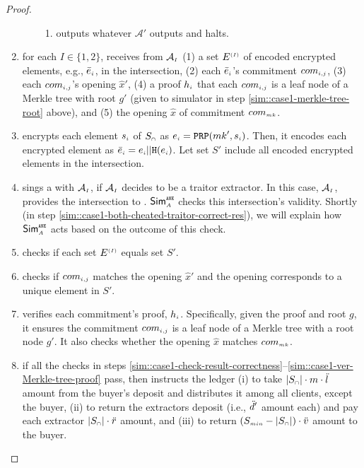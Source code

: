 \begin{proof}
\begin{enumerate}
\begin{enumerate}
\begin{enumerate}
%
\item outputs whatever $\mathcal{A}'$ outputs and halts.
 \end{enumerate}
 \end{enumerate}
%
\item\label{sim::case1-what-adv-extract-sends}  for each $I\in \{1,2\}$, receives from $\mathcal{A}_{\scriptscriptstyle I}$ (1) a set $E^{\scriptscriptstyle (I)}$ of encoded encrypted elements, e.g., $\bar e_{\scriptscriptstyle i}$, in the intersection, (2) each $\bar e_{\scriptscriptstyle i}$'s commitment $com_{\scriptscriptstyle i,j}$, (3) each $com_{\scriptscriptstyle i,j}$'s opening $\hat{x}'$, (4) a proof $h_{\scriptscriptstyle i}$ that each $com_{\scriptscriptstyle i,j}$ is a leaf node of a Merkle tree with root $g'$ (given to simulator in step \ref{sim::case1-merkle-tree-root} above), and (5) the opening $\hat x$ of commitment  $com_{\scriptscriptstyle {mk}}$.
%
\item encrypts each element $s_{\scriptscriptstyle i}$ of $S_{\scriptscriptstyle\cap}$ as $e_{\scriptscriptstyle i}=\mathtt{PRP}({mk}', s_{\scriptscriptstyle i})$. Then, it encodes each encrypted element as $\bar{e}_{\scriptscriptstyle i} =e_{\scriptscriptstyle i} || \mathtt{H}(e_{\scriptscriptstyle i})$. Let set $S'$ include all encoded encrypted elements in the intersection.
%
\item\label{sim::case1-traitor-cont} sings a \SCtc with $\mathcal{A}_{\scriptscriptstyle I}$, if $\mathcal{A}_{\scriptscriptstyle I}$ decides to be a traitor extractor. In this case, $\mathcal{A}_{\scriptscriptstyle I}$, provides the intersection to \SCtc.  $\mathsf{Sim}^{\scriptscriptstyle \mathtt{ANE}}_{\scriptscriptstyle A}$ checks this intersection's validity. Shortly (in step \ref{sim::case1-both-cheated-traitor-correct-res}), we will explain how $\mathsf{Sim}^{\scriptscriptstyle \mathtt{ANE}}_{\scriptscriptstyle A}$ acts based on the outcome of this check. 
%
\item\label{sim::case1-check-result-correctness} checks if each set $E^{\scriptscriptstyle (I)}$ equals set $S'$. 
%
\item checks if $com_{\scriptscriptstyle i,j}$ matches the opening $\hat{x}'$ and the opening corresponds to a unique element in $S'$. 
%
\item\label{sim::case1-ver-Merkle-tree-proof} verifies each commitment's proof, $h_{\scriptscriptstyle i}$. Specifically, given the proof and root $g$, it ensures the commitment $com_{\scriptscriptstyle i,j}$  is a leaf node of a Merkle tree with a root node $g'$. It also checks whether the opening $\hat x$ matches $com_{\scriptscriptstyle {mk}}$. 
%
%
\item \label{sim::case1-all-check-pass} if all the checks in steps \ref{sim::case1-check-result-correctness}--\ref{sim::case1-ver-Merkle-tree-proof} pass, then instructs the ledger (i) to take $|S_{\scriptscriptstyle\cap}|\cdot m\cdot \ddot{l}$ amount from the buyer's deposit and distributes it among all clients, except the buyer, (ii) to return the extractors deposit (i.e., $\ddot{d}'$ amount each) and pay each extractor $|S_{\scriptscriptstyle\cap}|\cdot \ddot{r}$ amount, and (iii) to return $(S_{\scriptscriptstyle min}-|S_{\scriptscriptstyle\cap}|)\cdot \ddot{v}$ amount to the buyer.

\end{enumerate}
\end{proof}
